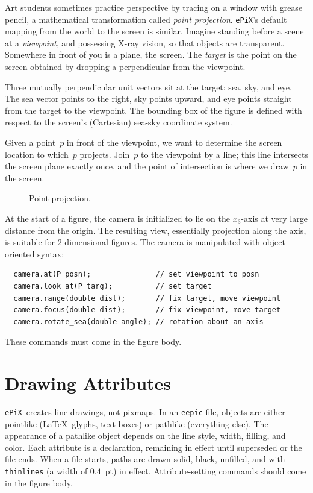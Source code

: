 \documentclass[12pt]{report}
\newcommand{\code}[1]{\texttt{#1}}
\newcommand{\ePiX}{\code{ePiX}}
\begin{document}
Art students sometimes practice perspective by tracing on a window
with grease pencil, a mathematical transformation called \emph{point
projection}. \ePiX's default mapping from the world to the screen is
similar. Imagine standing before a scene at a \emph{viewpoint}, and
possessing X-ray vision, so that objects are transparent. Somewhere in
front of you is a plane, the screen. The \emph{target} is the point on
the screen obtained by dropping a perpendicular from the viewpoint.

Three mutually perpendicular unit vectors sit at the target: sea, sky,
and eye. The sea vector points to the right, sky points upward, and
eye points straight from the target to the viewpoint. The bounding
box of the figure is defined with respect to the
screen's (Cartesian) sea-sky coordinate system.

Given a point~$p$ in front of the viewpoint, we want to determine the
screen location to which~$p$ projects. Join~$p$ to the viewpoint by a
line; this line intersects the screen plane exactly once, and the
point of intersection is where we draw~$p$ in the screen. 
\begin{figure}[hbt]
  \begin{center}
    
  \end{center}
  \caption{Point projection.}
  \label{fig:camera}
\end{figure}

At the start of a figure, the camera is initialized to lie on the
$x_3$-axis at very large distance from the origin. The resulting view,
essentially projection along the axis, is suitable for 2-dimensional
figures. The camera is manipulated with object-oriented syntax:
\begin{verbatim}
  camera.at(P posn);               // set viewpoint to posn
  camera.look_at(P targ);          // set target
  camera.range(double dist);       // fix target, move viewpoint
  camera.focus(double dist);       // fix viewpoint, move target
  camera.rotate_sea(double angle); // rotation about an axis
\end{verbatim}
These commands must come in the figure body.


\section{Drawing Attributes}

\ePiX\ creates line drawings, not pixmaps.  In an \code{eepic} file,
objects are either pointlike (\LaTeX\ glyphs, text boxes) or pathlike
(everything else). The appearance of a pathlike object depends on the
line style, width, filling, and color. Each attribute
is a declaration, remaining in effect until superseded or the file
ends.  When a file starts, paths are drawn solid, black, unfilled, and
with \code{thinlines} (a width of $0.4$~pt) in effect.
Attribute-setting commands should come in the figure body.
\end{document}
